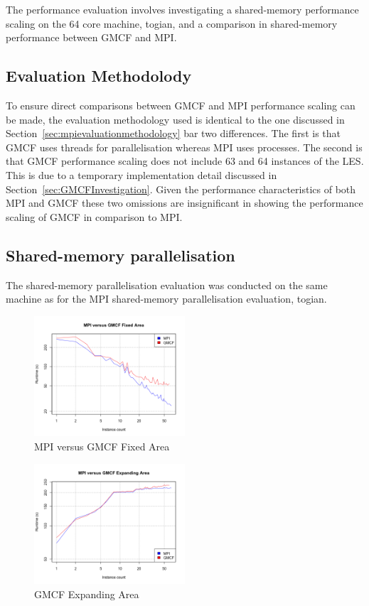The performance evaluation involves investigating a shared-memory performance
scaling on the 64 core machine, togian, and a comparison in shared-memory
performance between GMCF and MPI.

\subsection{Evaluation Methodolody}

To ensure direct comparisons between GMCF and MPI performance scaling can be
made, the evaluation methodology used is identical to the one discussed in
Section~\ref{sec:mpievaluationmethodology} bar two differences. The first is
that GMCF uses threads for parallelisation whereas MPI uses processes. The
second is that GMCF performance scaling does not include 63 and 64 instances of
the LES. This is due to a temporary implementation detail discussed in
Section~\ref{sec:GMCFInvestigation}. Given the performance characteristics of
both MPI and GMCF these two omissions are insignificant in showing the
performance scaling of GMCF in comparison to MPI.

\subsection{Shared-memory parallelisation}

The shared-memory parallelisation evaluation was conducted on the same machine
as for the MPI shared-memory parallelisation evaluation, togian.

\begin{figure}
    \includegraphics[width=0.5\textwidth]{graphs/GMCF-MPI-fixed-area.png}
    \caption{MPI versus GMCF Fixed Area}
    \label{fig:gmcfmpifixedarea}
\end{figure}

\begin{figure}
    \includegraphics[width=0.5\textwidth]{graphs/GMCF-MPI-expanding-area.png}
    \caption{GMCF Expanding Area}
    \label{fig:gmcfmpiexpandingarea}
\end{figure}

